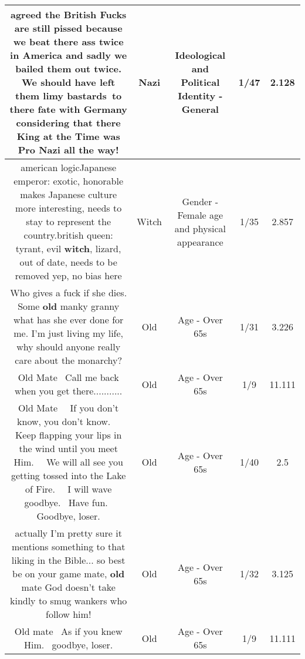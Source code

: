 \documentclass[11pt]{article}
\newlength\mylength
\begin{document}
\begin{center}
\begin{longtable}{|C{.65\mylength}|C{.30\mylength}|C{.12\mylength}|C{.12\mylength}|C{.12\mylength}|}
  \small agreed the British Fucks are still pissed because we beat there ass twice in America and sadly we bailed them out twice. We should have left them limy bastards to there fate with Germany considering that there King at the Time was Pro \textbf{Nazi} all the way!\normalsize   & Nazi &  Ideological and Political Identity - General & 1/47 & 2.128 \\  \hline
  \small american logicJapanese emperor:  exotic, honorable makes Japanese culture more interesting, needs to stay to represent the country.british queen: tyrant, evil \textbf{witch}, lizard, out of date, needs to be removed yep, no bias here\normalsize   & Witch & Gender - Female age and physical appearance & 1/35 & 2.857 \\  \hline
  \small Who gives a fuck if she dies. Some \textbf{old} manky granny what has she ever done for me. I'm just living my life, why should anyone really care about the monarchy?\normalsize   & Old & Age - Over 65s & 1/31 & 3.226 \\  \hline
  \small Old Mate  Call me back when you get there...........\normalsize   & Old & Age - Over 65s & 1/9 & 11.111 \\  \hline
  \small Old Mate   If you don't know, you don't know.   Keep flapping your lips in the wind until you meet Him.   We will all see you getting tossed into the Lake of Fire.   I will wave goodbye.  Have fun.  Goodbye, loser.\normalsize   & Old & Age - Over 65s & 1/40 & 2.5 \\  \hline
  \small actually I'm pretty sure it mentions something to that liking in the Bible... so best be on your game mate, \textbf{old} mate God doesn't take kindly to smug wankers who follow him!\normalsize   & Old & Age - Over 65s & 1/32 & 3.125 \\  \hline
  \small Old mate  As if you knew Him.  goodbye, loser.\normalsize   & Old & Age - Over 65s & 1/9 & 11.111 \\  \hline

\end{longtable}
\end{center}
\end{document}

